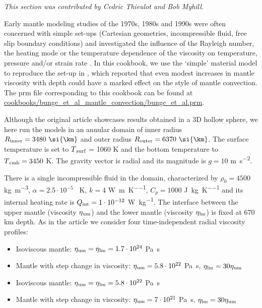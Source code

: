 \documentclass{article}
\begin{document}
\textit{This section was contributed by Cedric Thieulot and Bob Myhill.}

Early mantle modeling studies of the 1970s, 1980s and 1990s were often concerned with simple set-ups (Cartesian geometries, incompressible fluid, free slip boundary conditions) and investigated the influence of the Rayleigh number, the heating mode or the temperature dependence of the viscosity on temperature, pressure and/or strain rate \cite{youn74,buss75,buss79,BBC89,BC93,vavy93,burb97}. In this cookbook, we use the `simple' material model to reproduce the set-up in \cite{burb96}, which reported that even modest increases in mantle viscosity with depth could have a marked effect on the style of mantle convection. The prm file corresponding to this cookbook can be found at \url{cookbooks/bunge_et_al_mantle_convection/bunge_et_al.prm}.

Although the original article showcases results obtained in a 3D hollow sphere, we here run the models in an annular domain of inner radius $R\textsubscript{inner} = 3480~\si{\km}$ and outer radius  $R\textsubscript{outer} = 6370~\si{\km}$. The surface temperature is set to $T{\textsubscript{surf}}$ = 1060 \si{\kelvin} and
the bottom temperature to $T{\textsubscript{cmb}} = 3450$ \si{\kelvin}. The gravity vector is radial and its magnitude is $g = 10$ \si{\meter\per\second\squared}.

There is a single incompressible fluid in the domain, characterized by $\rho_0 = 4500$ \si{\kilogram\per\meter\cubed}, $\alpha = 2.5\cdot10^{-5}$ \si{\per\kelvin},
$k = 4$ \si{\watt\per\meter\per\kelvin},
$C_p = 1000$ \si{\joule\per\kilogram\per\kelvin} and
its internal heating rate is $Q{\textsubscript{int}} = 1\cdot10^{-12}$ \si{\watt\per\kilogram}.
The interface between the upper mantle (viscosity $\eta\textsubscript{um}$)
and the lower mantle (viscosity $\eta\textsubscript{lm}$) is fixed at 670 \si{\kilo\meter} depth.
As in the article we consider four time-independent radial viscosity profiles:

\begin{itemize}
\item[a)] Isoviscous mantle: $\eta\textsubscript{um}=\eta\textsubscript{lm}=1.7\cdot 10^{24}$ \si{\pascal\second}
\item[b)] Mantle with step change in viscosity: $\eta\textsubscript{um}=5.8\cdot 10^{22}$ \si{\pascal\second}, $\eta\textsubscript{lm}=30\eta\textsubscript{um}$
\item[c)] Isoviscous mantle: $\eta\textsubscript{um}=\eta\textsubscript{lm}=5.8\cdot 10^{22}$ \si{\pascal\second}
\item[d)] Mantle with step change in viscosity: $\eta\textsubscript{um}=7\cdot 10^{21}$ \si{\pascal\second},  $\eta\textsubscript{lm}=30\eta\textsubscript{um}$
\end{itemize}
\end{document}
